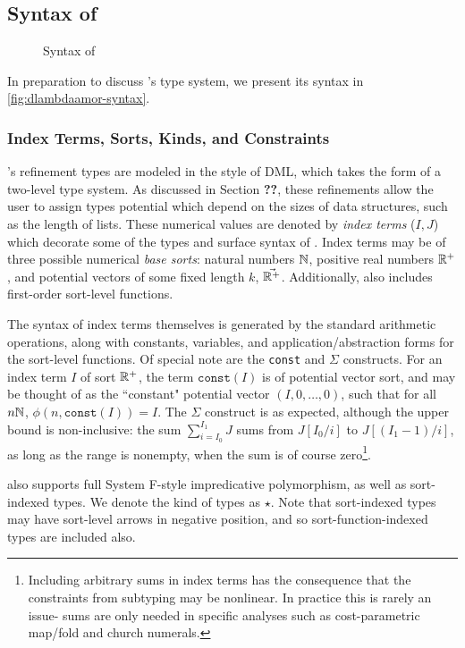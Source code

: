 \subsection{Syntax of \dlambdaamor}
\begin{figure}

\caption{Syntax of \dlambdaamor}
\label{fig:dlambdaamor-syntax}
\end{figure}

In preparation to discuss \dlambdaamor's type system, we present its syntax in \autoref{fig:dlambdaamor-syntax}.

\subsubsection{Index Terms, Sorts, Kinds, and Constraints}
\dlambdaamor's refinement types are modeled in the style of DML, which takes the form of a two-level type system. As discussed in Section \textbf{??}, these refinements allow the user to assign types potential which depend on the sizes of data structures, such as the length of lists. These numerical values are denoted by \textit{index terms} ($I,J$) which decorate some of the types and surface syntax of \dlambdaamor. Index terms may be of three possible numerical \textit{base sorts}: natural numbers $\mathbb{N}$, positive real numbers $\mathbb{R}^+$, and potential vectors of some fixed length $k$, $\vec{\mathbb{R}^+}$. Additionally, \dlambdaamor also includes first-order sort-level functions.

The syntax of index terms themselves is generated by the standard arithmetic operations, along with constants, variables, and application/abstraction forms for the sort-level functions. Of special note are the \texttt{const} and $\Sigma$ constructs. For an index term $I$ of sort $\mathbb{R}^+$, the term $\texttt{const}(I)$ is of potential vector sort, and may be thought of as the ``constant" potential vector $(I,0,\dots,0)$, such that for all $n \mathbb{N}$, $\phi(n,\texttt{const}(I)) = I$.
The $\Sigma$ construct is as expected, although the upper bound is non-inclusive: the sum $\sum_{i=I_0}^{I_1} J$ sums from $J[I_0/i]$ to $J[(I_1-1)/i]$, as long as the range is nonempty, when the sum is of course zero\footnote{
Including arbitrary sums in index terms has the consequence that the constraints from subtyping may be nonlinear. In practice this is rarely an issue- sums are only needed in specific analyses such as cost-parametric map/fold and church numerals.
}.

\dlambdaamor also supports full System F-style impredicative polymorphism, as well as sort-indexed types. We denote the kind of types as $\star$. Note that sort-indexed types may have sort-level arrows in negative position, and so sort-function-indexed types are included also.

